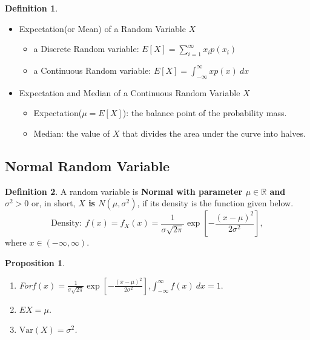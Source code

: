 \documentclass[12pt,openany]{book}
\newtheorem{proposition}[theorem]{Proposition}
\theoremstyle{definition}
\newtheorem{definition}{Definition}[chapter]
\newcommand{\dispsty}{\displaystyle}
\newcommand{\Var}{\text{Var}}
\begin{document}
	\begin{tcolorbox}[colback=white,colframe=defcolor,arc=5pt,title={\color{white}\bf Expectation of a Continuous Random Variable}]
		\begin{definition}
			\ \begin{itemize}
				\item Expectation(or Mean) of a Random Variable $X$\begin{itemize}
					\item a Discrete Random variable: $E[X]=\sum_{i=1}^\infty x_ip(x_i)$
					\item a Continuous Random variable: $E[X]=\int_{-\infty}^\infty xp(x)\ dx$
				\end{itemize}
				\item Expectation and Median of a Continuous Random Variable $X$\begin{itemize}
					\item Expectation($\mu=E[X]$): the balance point of the probability mass.
					\item Median: the value of $X$ that divides the area under the curve into halves.
				\end{itemize}
			\end{itemize}
		\end{definition}
	\end{tcolorbox}
	
	\subsection{Normal Random Variable}
	\begin{tcolorbox}[colback=white,colframe=defcolor,arc=5pt,title={\color{white}\bf Normal Random Variable}]
		\begin{definition}
			A random variable is \textbf{Normal with parameter $\mu\in\mathbb{R}$ and $\sigma^2>0$} or, in short, \textbf{$X$ is $N(\mu,\sigma^2)$}, if its density is the function given below. \[
			\text{Density}:\ f(x)=f_X(x)=\frac{1}{\sigma\sqrt{2\pi}}\exp\left[-\frac{(x-\mu)^2}{2\sigma^2}\right],
			\] where $x\in(-\infty,\infty)$.
		\end{definition}
	\end{tcolorbox}
	\vspace{10pt}
	\begin{tcolorbox}[colback=white,colframe=procolor,arc=5pt,title={\color{white}\bf }]
		\begin{proposition}
			\ \begin{enumerate}[(1)]
				\item For$f(x)=\dispsty\frac{1}{\sigma\sqrt{2\pi}}\exp\left[-\frac{(x-\mu)^2}{2\sigma^2}\right]$,\quad $
				\dispsty\int_{-\infty}^{\infty} f(x)\ dx=1.
				$
				\item $EX=\mu$.
				\item $\Var(X)=\sigma^2$.
			\end{enumerate}
		\end{proposition}
	\end{tcolorbox}
\end{document}
